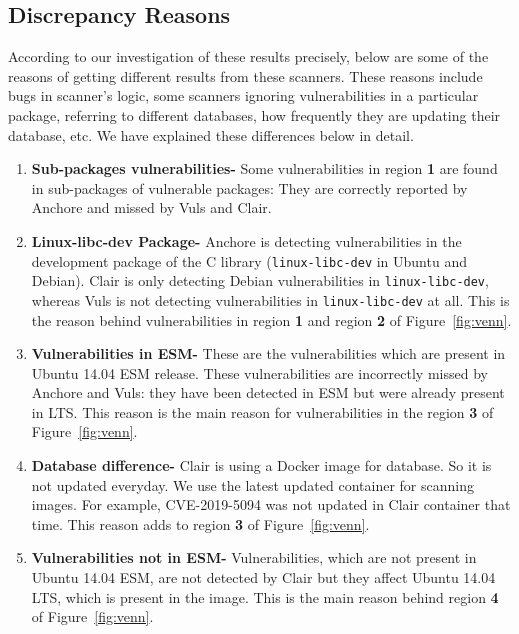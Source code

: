 \subsection{Discrepancy Reasons}
According to our investigation of these results precisely, below are some of the reasons of
getting different results from these scanners. These reasons include bugs in scanner's logic,
some scanners ignoring vulnerabilities in a particular package, referring to different databases,
how frequently they are updating their database, etc. We have explained these differences below in detail.
\begin{enumerate}
\item\textbf{Sub-packages vulnerabilities-} Some vulnerabilities in region
	        \textbf{1} are found in sub-packages of vulnerable packages: They are
                 correctly reported by Anchore and missed by Vuls and Clair.

\item\textbf{Linux-libc-dev Package-} Anchore is detecting vulnerabilities in the development
                package of the C library (\texttt{linux-libc-dev} in Ubuntu and Debian). Clair is
		only detecting Debian vulnerabilities in \texttt{linux-libc-dev}, whereas Vuls
		is not detecting vulnerabilities in \texttt{linux-libc-dev} at all. This is the
		reason behind vulnerabilities in region \textbf{1} and region \textbf{2} of
		Figure~\ref{fig:venn}.

\item \textbf{Vulnerabilities in ESM-} These are the vulnerabilities which are present in Ubuntu 14.04
        ESM release. These vulnerabilities are incorrectly missed by Anchore and Vuls: they have been
         detected in ESM but were already present in LTS. This reason is the main reason for vulnerabilities
	in the region \textbf{3} of Figure~\ref{fig:venn}.
	 
\item\textbf{Database difference-} Clair is using a Docker image for database. So it is not updated everyday.
                We use the latest updated container for scanning images. For example, CVE-2019-5094 was not
		updated in Clair container that time. This reason adds to region \textbf{3} of 
		Figure~\ref{fig:venn}.

\item\textbf{Vulnerabilities not in ESM-} Vulnerabilities, which are not present in Ubuntu 14.04 ESM,
	are not detected by Clair but they affect Ubuntu 14.04 LTS, which is present in the image. 
		This is the main reason behind region \textbf{4}
		of Figure~\ref{fig:venn}.


\end{enumerate}
